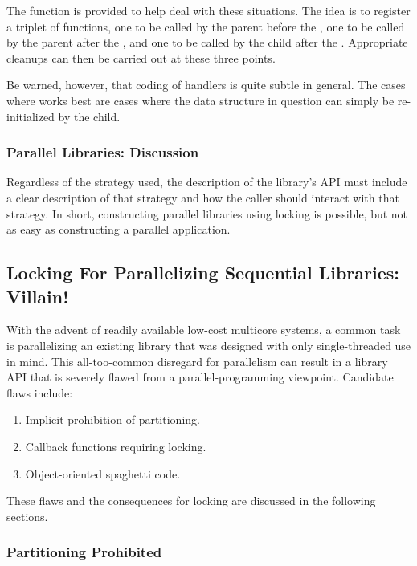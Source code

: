 The  function is provided to help deal with these situations.
The idea is to register a triplet of functions, one to be called by the
parent before the , one to be called by the parent after the
, and one to be called by the child after the .
Appropriate cleanups can then be carried out at these three points.

Be warned, however, that coding of  handlers is quite subtle
in general.
The cases where  works best are cases where the data structure
in question can simply be re-initialized by the child.

\subsubsection{Parallel Libraries: Discussion}
\label{sec:locking:Parallel Libraries: Discussion}

Regardless of the strategy used, the description of the library's API
must include a clear description of that strategy and how the caller
should interact with that strategy.
In short, constructing parallel libraries using locking is possible,
but not as easy as constructing a parallel application.

\subsection{Locking For Parallelizing Sequential Libraries: Villain!}
\label{sec:locking:Locking For Parallelizing Sequential Libraries: Villain!}

With the advent of readily available low-cost multicore systems,
a common task is parallelizing an existing library that was designed
with only single-threaded use in mind.
This all-too-common disregard for parallelism can result in a library
API that is severely flawed from a parallel-programming viewpoint.
Candidate flaws include:

\begin{enumerate}
\item	Implicit prohibition of partitioning.
\item	Callback functions requiring locking.
\item	Object-oriented spaghetti code.
\end{enumerate}

These flaws and the consequences for locking are discussed in the following
sections.

\subsubsection{Partitioning Prohibited}
\label{sec:locking:Partitioning Prohibited}

